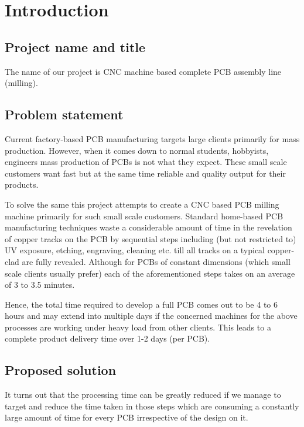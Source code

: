 \chapter{Introduction}
\thispagestyle{empty} %

\setcounter{page}{2} %

\section{Project name and title}
The name of our project is CNC machine based complete PCB assembly line (milling).

\section{Problem statement}
Current factory-based PCB manufacturing targets large clients primarily for mass production. However, when it comes down to normal students, hobbyists, engineers mass production of PCBs is not what they expect. These small scale customers want fast but at the same time reliable and quality output for their products. \par

To solve the same this project attempts to create a CNC based PCB milling machine primarily for such small scale customers. Standard home-based PCB manufacturing techniques waste a considerable amount of time in the revelation of copper tracks on the PCB by sequential steps including (but not restricted to) UV exposure, etching, engraving, cleaning etc. till all tracks on a typical copper-clad are fully revealed. Although for PCBs of constant dimensions (which small scale clients usually prefer) each of the aforementioned steps takes on an average of 3 to 3.5 minutes. \par

Hence, the total time required to develop a full PCB comes out to be 4 to 6 hours and may extend into multiple days if the concerned machines for the above processes are working under heavy load from other clients. This leads to a complete product delivery time over 1-2 days (per PCB).


\section{Proposed solution}
It turns out that the processing time can be greatly reduced if we manage to target and reduce the time taken in those steps which are consuming a constantly large amount of time for every PCB irrespective of the design on it.  \par

